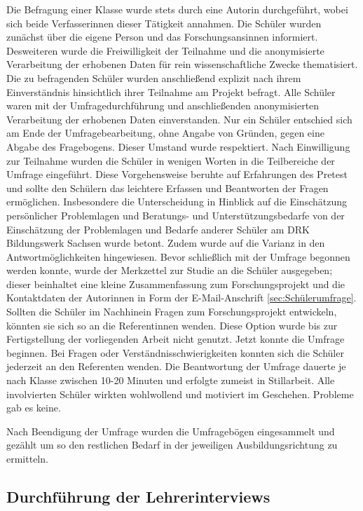 Die Befragung einer Klasse wurde stets durch eine Autorin durchgeführt, wobei sich beide Verfasserinnen dieser Tätigkeit annahmen.
Die Schüler wurden zunächst über die eigene Person und das Forschungsansinnen informiert. Desweiteren wurde die Freiwilligkeit der Teilnahme und die anonymisierte Verarbeitung der erhobenen Daten für rein wissenschaftliche Zwecke thematisiert. Die zu befragenden Schüler wurden anschließend explizit nach ihrem Einverständnis hinsichtlich ihrer Teilnahme am Projekt befragt. Alle Schüler waren mit der Umfragedurchführung und anschließenden anonymisierten Verarbeitung der erhobenen Daten einverstanden. Nur ein Schüler entschied sich am Ende der Umfragebearbeitung, ohne Angabe von Gründen, gegen eine Abgabe des Fragebogens. Dieser Umstand wurde respektiert. Nach Einwilligung zur Teilnahme wurden die Schüler in wenigen Worten in die Teilbereiche der Umfrage eingeführt. Diese Vorgehensweise beruhte auf Erfahrungen des Pretest und sollte den Schülern das leichtere Erfassen und Beantworten der Fragen ermöglichen. Insbesondere die Unterscheidung in Hinblick auf die Einschätzung persönlicher Problemlagen und Beratungs- und Unterstützungsbedarfe von der Einschätzung der Problemlagen und Bedarfe anderer Schüler am DRK Bildungswerk Sachsen wurde betont. Zudem wurde auf die Varianz in den Antwortmöglichkeiten hingewiesen. Bevor schließlich mit der Umfrage begonnen werden konnte, wurde der Merkzettel zur Studie an die Schüler ausgegeben; dieser beinhaltet eine kleine Zusammenfassung zum Forschungsprojekt und die Kontaktdaten der Autorinnen in Form der E-Mail-Anschrift \ref{sec:Schülerumfrage}. Sollten die Schüler im Nachhinein Fragen zum Forschungsprojekt entwickeln, könnten sie sich so an die Referentinnen wenden. Diese Option wurde bis zur Fertigstellung der vorliegenden Arbeit nicht genutzt. Jetzt konnte die Umfrage beginnen. Bei Fragen oder Verständnisschwierigkeiten konnten sich die Schüler jederzeit an den Referenten wenden. Die Beantwortung der Umfrage dauerte je nach Klasse zwischen 10-20 Minuten und erfolgte zumeist in Stillarbeit. Alle involvierten Schüler wirkten wohlwollend und motiviert im Geschehen. Probleme gab es keine.

Nach Beendigung der Umfrage wurden die Umfragebögen eingesammelt und gezählt um so den restlichen Bedarf in der jeweiligen Ausbildungsrichtung zu ermitteln.

\subsection{Durchführung der Lehrerinterviews}
\label{sec:DurchführungDerLehrerinterviews}

